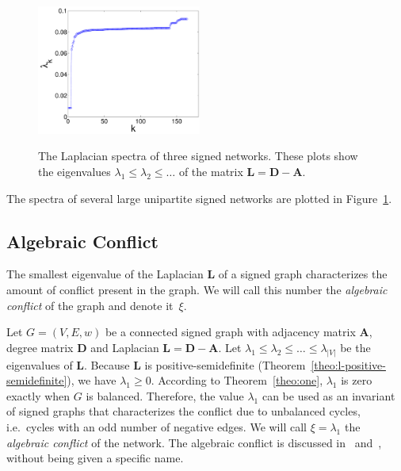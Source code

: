 \documentclass[11pt,a4paper]{book}
\newcommand{\wTwo}{0.48}
\begin{document}
\begin{figure}[h!]
{    \includegraphics[width=\wTwo\textwidth]{img-st/spectrum.full.elec.l.lap}}

  \caption{
    The Laplacian spectra of three signed networks.  
    These plots show the eigenvalues $\lambda_1 \leq \lambda_2 \leq
    \ldots$ of the matrix $\mathbf L = \mathbf D - \mathbf A$. 
  }   
  \label{fig:spectra}
\end{figure}

The spectra of several large unipartite signed networks
are plotted in Figure~\ref{fig:spectra}.  

\subsection{Algebraic Conflict}
\label{sec:algebraic-conflict}
The smallest eigenvalue of the Laplacian $\mathbf L$ of a signed graph
characterizes the amount of conflict present in the graph.  We will call
this number the \emph{algebraic conflict} of the graph and denote
it~$\xi$.   

Let $G=(V,E,w)$ be a connected signed graph with adjacency matrix $\mathbf A$,
degree matrix $\mathbf D$ and Laplacian $\mathbf L = \mathbf D
- \mathbf A$. 
Let $\lambda_1 \leq \lambda_2 \leq \ldots \leq \lambda_{|V|}$ be the
eigenvalues of $\mathbf L$.  
Because $\mathbf L$ is positive-semidefinite
(Theorem~\ref{theo:l-positive-semidefinite}), we have $\lambda_1 \geq 0$.
According to Theorem~\ref{theo:one}, $\lambda_1$ is zero exactly when $G$ is
balanced.  Therefore, the value $\lambda_1$ can be used as an
invariant of signed graphs that characterizes the conflict due to
unbalanced cycles, i.e.\ cycles with an odd number of negative edges.  
We will call $\xi = \lambda_1$ the \emph{algebraic conflict} of the network. 
The algebraic conflict is discussed in~\cite{b351}
and~\cite{kunegis:signed-kernels}, without being given a specific name.   
\end{document}
